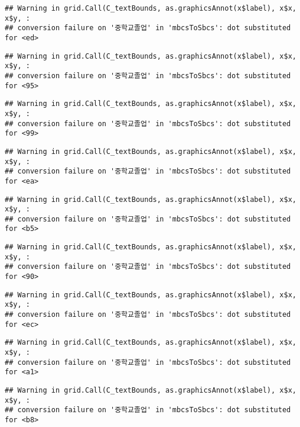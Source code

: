 \documentclass[
]{article}
\begin{document}
\begin{verbatim}
## Warning in grid.Call(C_textBounds, as.graphicsAnnot(x$label), x$x, x$y, :
## conversion failure on '중학교졸업' in 'mbcsToSbcs': dot substituted for <ed>
\end{verbatim}

\begin{verbatim}
## Warning in grid.Call(C_textBounds, as.graphicsAnnot(x$label), x$x, x$y, :
## conversion failure on '중학교졸업' in 'mbcsToSbcs': dot substituted for <95>
\end{verbatim}

\begin{verbatim}
## Warning in grid.Call(C_textBounds, as.graphicsAnnot(x$label), x$x, x$y, :
## conversion failure on '중학교졸업' in 'mbcsToSbcs': dot substituted for <99>
\end{verbatim}

\begin{verbatim}
## Warning in grid.Call(C_textBounds, as.graphicsAnnot(x$label), x$x, x$y, :
## conversion failure on '중학교졸업' in 'mbcsToSbcs': dot substituted for <ea>
\end{verbatim}

\begin{verbatim}
## Warning in grid.Call(C_textBounds, as.graphicsAnnot(x$label), x$x, x$y, :
## conversion failure on '중학교졸업' in 'mbcsToSbcs': dot substituted for <b5>
\end{verbatim}

\begin{verbatim}
## Warning in grid.Call(C_textBounds, as.graphicsAnnot(x$label), x$x, x$y, :
## conversion failure on '중학교졸업' in 'mbcsToSbcs': dot substituted for <90>
\end{verbatim}

\begin{verbatim}
## Warning in grid.Call(C_textBounds, as.graphicsAnnot(x$label), x$x, x$y, :
## conversion failure on '중학교졸업' in 'mbcsToSbcs': dot substituted for <ec>
\end{verbatim}

\begin{verbatim}
## Warning in grid.Call(C_textBounds, as.graphicsAnnot(x$label), x$x, x$y, :
## conversion failure on '중학교졸업' in 'mbcsToSbcs': dot substituted for <a1>
\end{verbatim}

\begin{verbatim}
## Warning in grid.Call(C_textBounds, as.graphicsAnnot(x$label), x$x, x$y, :
## conversion failure on '중학교졸업' in 'mbcsToSbcs': dot substituted for <b8>
\end{verbatim}
\end{document}
